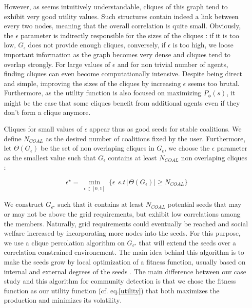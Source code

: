\documentclass[conference]{IEEEtran}
\begin{document}
However, as seems intuitively understandable, cliques of this graph tend to exhibit very good utility values. Such  structures contain indeed a link between every two nodes, meaning that the overall correlation is quite small. Obviously, the $ \epsilon $ parameter is indirectly responsible for the sizes of the cliques : if it is too low, $ G_{\epsilon} $ does not provide enough cliques, conversely, if $\epsilon $ is too high, we loose important information as the graph becomes very dense and cliques tend to overlap strongly. For large values of $ \epsilon $ and for non trivial number of agents, finding cliques can even become computationally intensive. Despite being direct and simple, improving the sizes of the cliques by increasing $ \epsilon $ seems too brutal. Furthermore, as the utility function is also focused on maximizing $ P_{\phi}(s) $, it might be the case that some cliques benefit from additional agents even if they don't form a clique anymore.

Cliques for small values of $ \epsilon $ appear thus as good seeds for stable coalitions. We define $ N_{COAL} $ as the desired number of coalitions fixed by the user. Furthermore, let $ \Theta(G_{\epsilon}) $ be the set of non overlaping cliques in $ G_{\epsilon} $, we choose the $ \epsilon $ parameter as the smallest value such that $ G_{\epsilon} $ contains at least $ N_{COAL} $ non overlaping cliques :

\begin{equation}
\epsilon^{\star} = \min_{\substack{ \epsilon \in [0,1] }} \Big\{ \epsilon\,\ s.t\ |\Theta(G_{\epsilon})| \geq N_{COAL} \Big\}
\end{equation}

We construct $ G_{\epsilon^{\star}} $ such that it contains at least $ N_{COAL} $ potential seeds that may or may not be above the grid requirements, but exhibit low correlations among the members. Naturally, grid requirements could eventually be reached and social welfare increased by incorporating more nodes into the seeds. For this purpose, we use a clique percolation algorithm on $ G_{\epsilon^{\star}} $ that will extend the seeds over a correlation constrained environement. The main idea behind this algorithm is to make the seeds grow by local optimization of a fitness function, usually based on internal and external degrees of the seeds \cite{Lancichinetti}. The main difference between our case study and this algorithm for community detection is that we chose the fitness function as our utility function (cf. eq.\eqref{utility}) that both maximizes the production and minimizes its volatility.  
\end{document}
